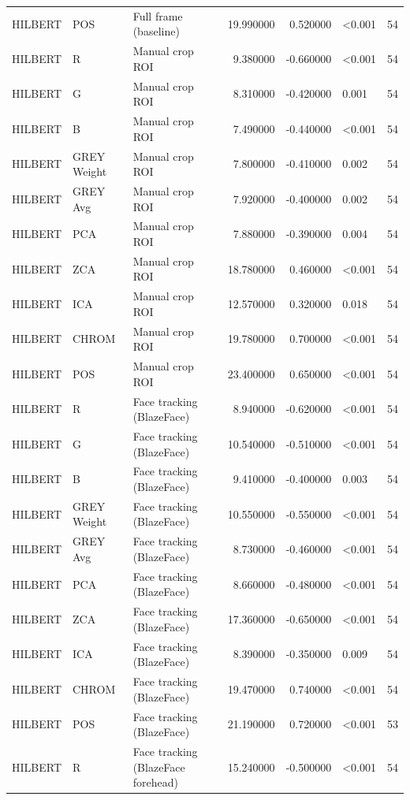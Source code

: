 \begin{table}[htbp]
\begin{tabular}{l l l r r l r}
HILBERT & POS & Full frame (baseline) & 19.990000 & 0.520000 & <0.001 & 54 \\
HILBERT & R & Manual crop ROI & 9.380000 & -0.660000 & <0.001 & 54 \\
HILBERT & G & Manual crop ROI & 8.310000 & -0.420000 & 0.001 & 54 \\
HILBERT & B & Manual crop ROI & 7.490000 & -0.440000 & <0.001 & 54 \\
HILBERT & GREY Weight & Manual crop ROI & 7.800000 & -0.410000 & 0.002 & 54 \\
HILBERT & GREY Avg & Manual crop ROI & 7.920000 & -0.400000 & 0.002 & 54 \\
HILBERT & PCA & Manual crop ROI & 7.880000 & -0.390000 & 0.004 & 54 \\
HILBERT & ZCA & Manual crop ROI & 18.780000 & 0.460000 & <0.001 & 54 \\
HILBERT & ICA & Manual crop ROI & 12.570000 & 0.320000 & 0.018 & 54 \\
HILBERT & CHROM & Manual crop ROI & 19.780000 & 0.700000 & <0.001 & 54 \\
HILBERT & POS & Manual crop ROI & 23.400000 & 0.650000 & <0.001 & 54 \\
HILBERT & R & Face tracking (BlazeFace) & 8.940000 & -0.620000 & <0.001 & 54 \\
HILBERT & G & Face tracking (BlazeFace) & 10.540000 & -0.510000 & <0.001 & 54 \\
HILBERT & B & Face tracking (BlazeFace) & 9.410000 & -0.400000 & 0.003 & 54 \\
HILBERT & GREY Weight & Face tracking (BlazeFace) & 10.550000 & -0.550000 & <0.001 & 54 \\
HILBERT & GREY Avg & Face tracking (BlazeFace) & 8.730000 & -0.460000 & <0.001 & 54 \\
HILBERT & PCA & Face tracking (BlazeFace) & 8.660000 & -0.480000 & <0.001 & 54 \\
HILBERT & ZCA & Face tracking (BlazeFace) & 17.360000 & -0.650000 & <0.001 & 54 \\
HILBERT & ICA & Face tracking (BlazeFace) & 8.390000 & -0.350000 & 0.009 & 54 \\
HILBERT & CHROM & Face tracking (BlazeFace) & 19.470000 & 0.740000 & <0.001 & 54 \\
HILBERT & POS & Face tracking (BlazeFace) & 21.190000 & 0.720000 & <0.001 & 53 \\
HILBERT & R & Face tracking (BlazeFace forehead) & 15.240000 & -0.500000 & <0.001 & 54 \\

\end{tabular}
\end{table}
